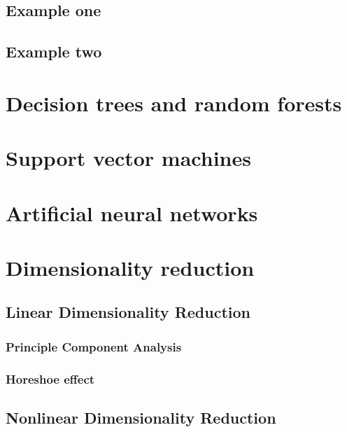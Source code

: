 \documentclass[]{book}
\theoremstyle{definition}
\theoremstyle{definition}
\theoremstyle{definition}
\theoremstyle{remark}
\begin{document}
\section{Example one}\label{example-one}

\section{Example two}\label{example-two}

\chapter{Decision trees and random
forests}\label{decision-trees-and-random-forests}

\chapter{Support vector machines}\label{support-vector-machines}

\chapter{Artificial neural networks}\label{artificial-neural-networks}

\chapter{Dimensionality reduction}\label{dimensionality-reduction}

\section{Linear Dimensionality
Reduction}\label{linear-dimensionality-reduction}

\subsection{Principle Component
Analysis}\label{principle-component-analysis}

\subsection{Horeshoe effect}\label{horeshoe-effect}

\section{Nonlinear Dimensionality
Reduction}\label{nonlinear-dimensionality-reduction}
\end{document}
